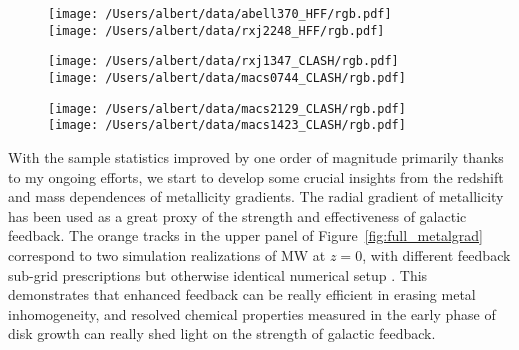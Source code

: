 \begin{figure}
    \centering
    \texttt{[image: /Users/albert/data/abell370\_HFF/rgb.pdf]}\\
    \texttt{[image: /Users/albert/data/rxj2248\_HFF/rgb.pdf]}
\end{figure}

\begin{figure}
    \centering
    \texttt{[image: /Users/albert/data/rxj1347\_CLASH/rgb.pdf]}\\
    \texttt{[image: /Users/albert/data/macs0744\_CLASH/rgb.pdf]}
\end{figure}

\begin{figure}
    \centering
    \texttt{[image: /Users/albert/data/macs2129\_CLASH/rgb.pdf]}\\
    \texttt{[image: /Users/albert/data/macs1423\_CLASH/rgb.pdf]}
\end{figure}

With the sample statistics improved by one order of magnitude primarily thanks to my ongoing efforts, we start to
develop some crucial insights from the redshift and mass dependences of metallicity gradients.
The radial gradient of metallicity has been used as a great proxy of the strength and effectiveness of
galactic feedback. The orange tracks in the upper panel of Figure~\ref{fig:full_metalgrad} correspond to two
simulation realizations of MW at $z=0$, with different feedback sub-grid prescriptions but otherwise identical
numerical setup \citep[][G13]{Gibson:2013jw}.
This demonstrates that enhanced feedback can be really efficient in erasing metal inhomogeneity, and resolved
chemical properties measured in the early phase of disk growth can really shed light on the strength of galactic
feedback.

